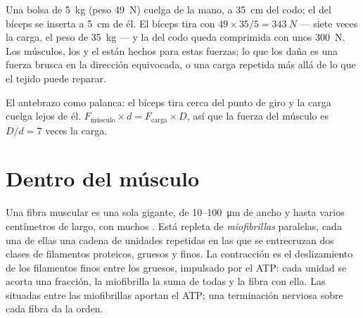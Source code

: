 \begin{example}\label{ex:g10:muscles-and-joints:bag}
Una bolsa de \qty{5}{kg} (peso \qty{49}{N}) cuelga de la mano, a
\qty{35}{cm} del codo; el  del bíceps se inserta a \qty{5}{cm} de
él. El bíceps tira con $49 \times 35/5 = \qty{343}{N}$ --- siete veces
la carga, el peso de \qty{35}{kg} --- y la  del codo queda
comprimida con unos \qty{300}{N}. Los músculos, los  y el
 están hechos para estas fuerzas; lo que los daña es una
fuerza brusca en la dirección equivocada, o una carga repetida más allá
de lo que el tejido puede reparar.
\end{example}

\begin{omfigure}

{\small El antebrazo como palanca: el bíceps tira cerca del punto de
giro y la carga cuelga lejos de él. $F_{\text{músculo}} \times d =
F_{\text{carga}} \times D$, así que la fuerza del músculo es $D/d = 7$
veces la carga.}
\end{omfigure}

\section{Dentro del músculo}

\begin{proposition}\label{prop:g10:muscles-and-joints:fibre}
Una fibra muscular es una sola  gigante, de \num{10}--\qty{100}{\micro m}
de ancho y hasta varios centímetros de largo, con muchos . Está
repleta de \emph{miofibrillas} paralelas, cada una de ellas una cadena
de unidades repetidas en las que se entrecruzan dos clases de
filamentos proteicos, gruesos y finos. La contracción es el
deslizamiento de los filamentos finos entre los gruesos, impulsado por
el ATP: cada unidad se acorta una fracción, la miofibrilla la suma de
todas y la fibra con ella. Las  situadas entre las
miofibrillas aportan el ATP; una terminación nerviosa sobre cada fibra
da la orden.
\end{proposition}
\admitted

